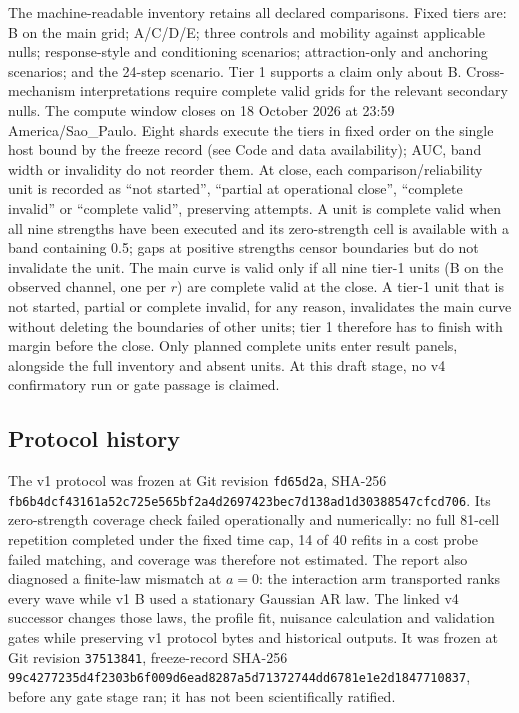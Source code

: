 The machine-readable inventory retains all declared comparisons. %
Fixed tiers are: B on the main grid; A/C/D/E; three controls and mobility against applicable nulls; response-style and conditioning scenarios; attraction-only and anchoring scenarios; and the 24-step scenario. %
Tier 1 supports a claim only about B. %
Cross-mechanism interpretations require complete valid grids for the relevant secondary nulls. %
The compute window closes on 18 October 2026 at 23:59 America/Sao\_Paulo. %
Eight shards execute the tiers in fixed order on the single host bound by the freeze record (see Code and data availability); AUC, band width or invalidity do not reorder them. %
At close, each comparison/reliability unit is recorded as ``not started'', ``partial at operational close'', ``complete invalid'' or ``complete valid'', preserving attempts. %
A unit is complete valid when all nine strengths have been executed and its zero-strength cell is available with a band containing 0.5; gaps at positive strengths censor boundaries but do not invalidate the unit. %
The main curve is valid only if all nine tier-1 units (B on the observed channel, one per $r$) are complete valid at the close. %
A tier-1 unit that is not started, partial or complete invalid, for any reason, invalidates the main curve without deleting the boundaries of other units; tier 1 therefore has to finish with margin before the close. %
Only planned complete units enter result panels, alongside the full inventory and absent units. %
At this draft stage, no v4 confirmatory run or gate passage is claimed. %

\subsection{Protocol history}

The v1 protocol was frozen at Git revision \texttt{fd65d2a}, SHA-256 \texttt{fb6b4dcf4316}\allowbreak\texttt{1a52c725e565}\allowbreak\texttt{bf2a4d269742}\allowbreak\texttt{3bec7d138ad1}\allowbreak\texttt{d30388547cfc}\allowbreak\texttt{d706}. %
Its zero-strength coverage check failed operationally and numerically: no full 81-cell repetition completed under the fixed time cap, 14 of 40 refits in a cost probe failed matching, and coverage was therefore not estimated. %
The report also diagnosed a finite-law mismatch at $a=0$: the interaction arm transported ranks every wave while v1 B used a stationary Gaussian AR law. %
The linked v4 successor changes those laws, the profile fit, nuisance calculation and validation gates while preserving v1 protocol bytes and historical outputs. %
It was frozen at Git revision \texttt{37513841}, freeze-record SHA-256 \texttt{99c4277235d4}\allowbreak\texttt{f2303b6f009d}\allowbreak\texttt{6ead8287a5d7}\allowbreak\texttt{1372744dd678}\allowbreak\texttt{1e1e2d184771}\allowbreak\texttt{0837}, before any gate stage ran; it has not been scientifically ratified. %

